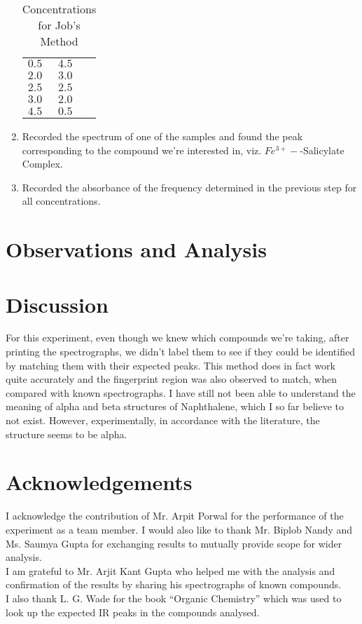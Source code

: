 \begin{enumerate}
\begin{table}
\begin{tabularx}{\textwidth}{Xll}
					\hline%
					$0.5$				& 	$4.5$\\
					$2.0$				& 	$3.0$\\
					$2.5$				& 	$2.5$\\
					$3.0$				& 	$2.0$\\
					$4.5$				& 	$0.5$\\
					\hline%
				\end{tabularx}
				\caption{Concentrations for Job's Method}
				\label{2A_conc}
			\end{table}
		\item Recorded the spectrum of one of the samples and found the peak corresponding to the compound we're interested in, viz. $Fe^{3+}-$-Salicylate Complex.
		\item Recorded the absorbance of the frequency determined in the previous step for all concentrations.
	\end{enumerate}

\section{Observations and Analysis}
	

\section{Discussion}
	For this experiment, even though we knew which compounds we're taking, after printing the spectrographs, we didn't label them to see if they could be identified by matching them with their expected peaks. This method does in fact work quite accurately and the fingerprint region was also observed to match, when compared with known spectrographs. I have still not been able to understand the meaning of alpha and beta structures of Naphthalene, which I so far believe to not exist. However, experimentally, in accordance with the literature, the structure seems to be alpha.\\

\section{Acknowledgements}
	I acknowledge the contribution of Mr. Arpit Porwal for the performance of the experiment as a team member. I would also like to thank Mr. Biplob Nandy and Ms. Saumya Gupta for exchanging results to mutually provide scope for wider analysis. \\
	I am grateful to Mr. Arjit Kant Gupta who helped me with the analysis and confirmation of the results by sharing his spectrographs of known compounds.\\
	I also thank L. G. Wade for the book ``Organic Chemistry'' which was used to look up the expected IR peaks in the compounds analysed.